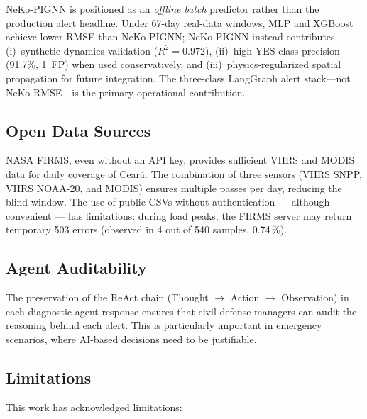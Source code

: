 \documentclass[preprint,12pt,times,numbers]{elsarticle}
\begin{document}
NeKo-PIGNN is positioned as an \emph{offline batch} predictor rather than the production alert headline. Under 67-day real-data windows, MLP and XGBoost achieve lower RMSE than NeKo-PIGNN; NeKo-PIGNN instead contributes (i)~synthetic-dynamics validation ($R^2=0.972$), (ii)~high YES-class precision (91.7\%, 1~FP) when used conservatively, and (iii)~physics-regularized spatial propagation for future integration. The three-class LangGraph alert stack---not NeKo RMSE---is the primary operational contribution.

\subsection{Open Data Sources}

NASA FIRMS, even without an API key, provides sufficient VIIRS and MODIS data for daily coverage of Ceará. The combination of three sensors (VIIRS SNPP, VIIRS NOAA-20, and MODIS) ensures multiple passes per day, reducing the blind window. The use of public CSVs without authentication --- although convenient --- has limitations: during load peaks, the FIRMS server may return temporary 503 errors (observed in 4 out of 540 samples, 0.74\,\%).

\subsection{Agent Auditability}

The preservation of the ReAct chain (Thought $\rightarrow$ Action $\rightarrow$ Observation) in each diagnostic agent response ensures that civil defense managers can audit the reasoning behind each alert. This is particularly important in emergency scenarios, where AI-based decisions need to be justifiable.

\subsection{Limitations}

This work has acknowledged limitations:
\end{document}
